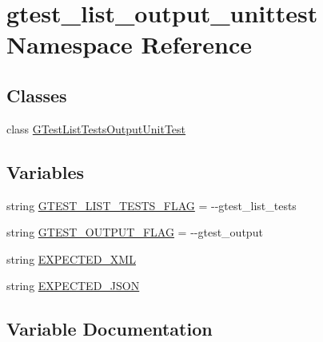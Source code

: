 \hypertarget{namespacegtest__list__output__unittest}{}\section{gtest\+\_\+list\+\_\+output\+\_\+unittest Namespace Reference}
\label{namespacegtest__list__output__unittest}
\subsection*{Classes}
\begin{DoxyCompactItemize}
\item 
class \mbox{\hyperlink{classgtest__list__output__unittest_1_1GTestListTestsOutputUnitTest}{G\+Test\+List\+Tests\+Output\+Unit\+Test}}
\end{DoxyCompactItemize}
\subsection*{Variables}
\begin{DoxyCompactItemize}
\item 
string \mbox{\hyperlink{namespacegtest__list__output__unittest_a37b4604332427bf1e439809e5b116cb5}{G\+T\+E\+S\+T\+\_\+\+L\+I\+S\+T\+\_\+\+T\+E\+S\+T\+S\+\_\+\+F\+L\+AG}} = \textquotesingle{}-\/-\/gtest\+\_\+list\+\_\+tests\textquotesingle{}
\item 
string \mbox{\hyperlink{namespacegtest__list__output__unittest_a3124ac294a9b2dd4fc504bf7d98b39a0}{G\+T\+E\+S\+T\+\_\+\+O\+U\+T\+P\+U\+T\+\_\+\+F\+L\+AG}} = \textquotesingle{}-\/-\/gtest\+\_\+output\textquotesingle{}
\item 
string \mbox{\hyperlink{namespacegtest__list__output__unittest_a8e3429fbd5f2ccb15d77af07b212c355}{E\+X\+P\+E\+C\+T\+E\+D\+\_\+\+X\+ML}}
\item 
string \mbox{\hyperlink{namespacegtest__list__output__unittest_ab23ce49d040a6881e33eec438c566c88}{E\+X\+P\+E\+C\+T\+E\+D\+\_\+\+J\+S\+ON}}
\end{DoxyCompactItemize}


\subsection{Variable Documentation}
\mbox{\label{namespacegtest__list__output__unittest_ab23ce49d040a6881e33eec438c566c88}} 
